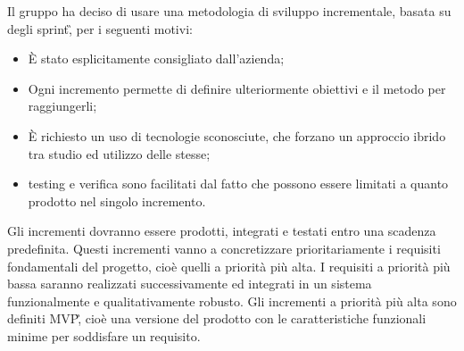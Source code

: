 Il gruppo ha deciso di usare una metodologia di sviluppo incrementale, basata su degli sprint\G, per i seguenti motivi:
\begin{itemize}
    \item 
        È stato esplicitamente consigliato dall'azienda;
    \item 
        Ogni incremento permette di definire ulteriormente 
        obiettivi e il metodo per raggiungerli;
    \item 
        È richiesto un uso di tecnologie sconosciute, che forzano un 
        approccio ibrido tra studio ed utilizzo delle stesse;
    \item
        testing e verifica sono facilitati dal fatto che possono essere 
        limitati a quanto prodotto nel singolo incremento.
\end{itemize}
Gli incrementi dovranno essere prodotti, integrati e testati entro una scadenza predefinita. Questi incrementi vanno a concretizzare prioritariamente i requisiti fondamentali del progetto, cioè quelli a priorità più alta. I requisiti a priorità più bassa saranno realizzati successivamente ed integrati in un sistema funzionalmente e qualitativamente robusto.
Gli incrementi a priorità più alta sono definiti MVP\G, cioè una versione del prodotto con le caratteristiche funzionali minime per soddisfare un requisito.




